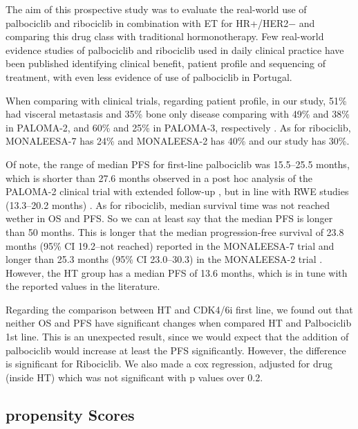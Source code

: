 The aim of this prospective study was to evaluate the real-world use of palbociclib and ribociclib in combination with ET for HR+/HER2$-$ and comparing this drug class with traditional hormonotherapy. Few real-world evidence studies of palbociclib and ribociclib used in daily clinical practice have been published identifying clinical benefit, patient profile and sequencing of treatment, with even less evidence of use of palbociclib in Portugal.

When comparing with clinical trials, regarding patient profile, in our study, 51\% had visceral metastasis and 35\% bone only disease comparing with 49\% and 38\% in PALOMA-2, and 60\% and 25\% in PALOMA-3, respectively \cite{rugoImpactPalbociclibLetrozole2018,cristofanilliFulvestrantPalbociclibFulvestrant2016a}.
As for ribociclib, MONALEESA-7 \cite{tripathyRibociclibEndocrineTherapy2018} has 24\% and MONALEESA-2 has 40\% \cite{hortobagyiUpdatedResultsMONALEESA22018} and our study has 30\%.



Of note, the range of median PFS for first-line palbociclib was 15.5–25.5 months, which is shorter than 27.6 months observed in a post hoc analysis of the PALOMA-2 clinical trial with extended follow-up \cite{rugoImpactPalbociclibLetrozole2018}, but in line with RWE studies (13.3–20.2 months) \cite{harbeckCDK4InhibitorsHR2021}.
As for ribociclib, median survival time was not reached wether in OS and PFS. So we can at least say that the median PFS is longer than 50 months. This is longer that the median progression-free survival of 23.8 months (95\% CI 19.2–not reached) reported in the MONALEESA-7 trial \cite{tripathyRibociclibEndocrineTherapy2018} and longer than  25.3 months (95\% CI 23.0–30.3) in the MONALEESA-2 trial \cite{hortobagyiUpdatedResultsMONALEESA22018}. However, the HT group has a median PFS of 13.6 months, which is in tune with the reported values in the literature.

Regarding the comparison between HT and CDK4/6i first line, we found out that neither OS and PFS have significant changes when compared HT and Palbociclib 1st line. This is an unexpected result, since we would expect that the addition of palbociclib would increase at least the PFS significantly.
However, the difference is significant for Ribociclib. We also made a cox regression, adjusted for drug (inside HT) which was not significant with p values over 0.2.



\subsection{propensity Scores}

